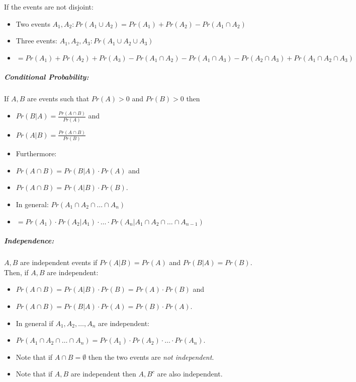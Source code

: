 \documentclass[landscape,10pt]{article}
\begin{document}
\begin{multicols}{3}
    If the events are not disjoint: 
        \begin{itemize}
            \item[] Two events $A_1, A_2: Pr(A_1 \cup A_2) = Pr(A_1) + Pr(A_2) - Pr(A_1 \cap A_2)$
            \item[] Three events: $A_1, A_2, A_3: Pr(A_1 \cup A_2 \cup A_3)$
            \item[] $= Pr(A_1) + Pr(A_2) + Pr(A_3) - Pr(A_1 \cap A_2) - Pr(A_1 \cap A_3) - Pr(A_2 \cap A_3) + Pr(A_1 \cap A_2 \cap A_3)$
        \end{itemize}  

    \subparagraph*{Conditional Probability: }
        If $A, B$ are events such that $Pr(A) > 0$ and $Pr(B) > 0$ then 
        \begin{itemize}
            \item[] $Pr(B|A) = \frac{Pr(A\cap B)}{Pr(A)}$ and 
            \item[] $Pr(A|B) = \frac{Pr(A \cap B)}{Pr(B)}$ 
            \item[] Furthermore: 
            \item[] $Pr(A \cap B) = Pr(B|A) \cdot Pr(A)$ and 
            \item[] $Pr(A \cap B) = Pr(A|B) \cdot Pr(B)$. 
            \item[] In general: $Pr(A_1 \cap A_2 \cap \ldots \cap A_n) $
            \item[] $= Pr(A_1) \cdot Pr(A_2 | A_1) \cdot \ldots \cdot Pr(A_n | A_1 \cap A_2 \cap \ldots \cap A_{n-1})$
        \end{itemize}

    \subparagraph*{Independence:}
        $A, B$ are independent events if $Pr(A|B) = Pr(A)$ and $Pr(B|A) = Pr(B)$. Then, if $A, B$ are independent: 
        \begin{itemize}
            \item[] $Pr(A \cap B) = Pr(A|B) \cdot Pr(B) = Pr(A) \cdot Pr(B)$ and 
            \item[] $Pr(A \cap B) = Pr(B | A) \cdot Pr(A) = Pr(B) \cdot Pr(A)$.
            \item[] In general if $A_1, A_2, \ldots, A_n$ are independent: 
            \item[] $Pr(A_1 \cap A_2 \cap \ldots \cap A_n) = Pr(A_1) \cdot Pr(A_2) \cdot \ldots \cdot Pr(A_n)$. 
            \item[] Note that if $A \cap B = \emptyset$ then the two events are \textit{not independent}. 
            \item[] Note that if $A, B$ are independent then $A, B^c$ are also independent.
        \end{itemize}


\end{multicols}
\end{document}
